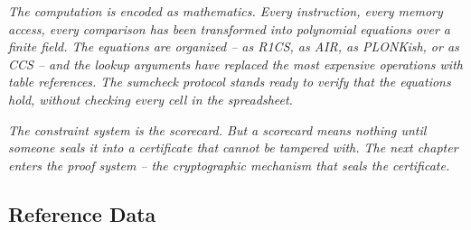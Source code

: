 \documentclass[
  11pt,
  openany]{report}
\begin{document}
\par\vspace{18pt}

\emph{The computation is encoded as mathematics. Every instruction, every memory
access, every comparison has been transformed into polynomial equations over a
finite field. The equations are organized -- as R1CS, as AIR, as PLONKish, or as
CCS -- and the lookup arguments have replaced the most expensive operations with
table references. The sumcheck protocol stands ready to verify that the
equations hold, without checking every cell in the spreadsheet.}

\emph{The constraint system is the scorecard. But a scorecard means nothing
until someone seals it into a certificate that cannot be tampered with. The next
chapter enters the proof system -- the cryptographic mechanism that seals the
certificate.}

\subsection{Reference Data}\label{reference-data}
\end{document}
